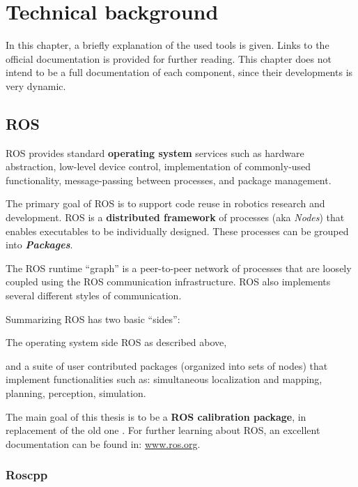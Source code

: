 \chapter{Technical background}
\label{cha:technical_background}

In this chapter, a briefly explanation of the used tools is given. Links to the official documentation is provided for further reading. This chapter does not intend to be a full documentation of each component, since their developments is very dynamic.

\section{ROS}
\label{sec:ros}

ROS provides standard \textbf{operating system} services such as hardware abstraction, low-level device control, implementation of commonly-used functionality, message-passing between processes, and package management.

The primary goal of ROS is to support code reuse in robotics research and development. ROS is a \textbf{distributed framework} of processes (aka \textit{Nodes}) that enables executables to be individually designed. These processes can be grouped into \textit{\textbf{Packages}}.

The ROS runtime ``graph'' is a peer-to-peer network of processes that are loosely coupled using the ROS communication infrastructure. ROS also implements several different styles of communication.

Summarizing ROS has two basic ``sides'':
\begin{itemize*}
 \item The operating system side ROS as described above,
 \item and a suite of user contributed packages (organized into sets of nodes) that implement functionalities such as: simultaneous localization and mapping, planning, perception, simulation.
\end{itemize*}

The main goal of this thesis is to be a \textbf{ROS calibration package}, in replacement of the old one \cite{pr2_calibration}. For further learning about ROS, an excellent documentation can be found in: \url{www.ros.org}.

\subsection{Roscpp}
\label{sec:roscpp}

